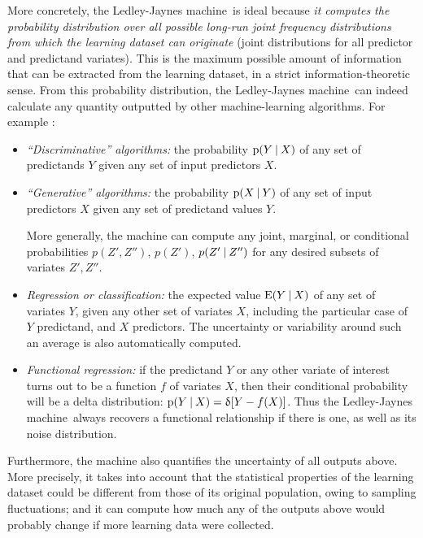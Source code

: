 \documentclass[utf8]{FrontiersinHarvard} %
\newcommand*{\sect}{\S}%
\newcommand*{\eg}{{e.g.}}
\newcommand*{\p}{\mathrm{p}}%
\newcommand*{\E}{\mathrm{E}}
\renewcommand*{\|}[1][]{\nonscript\:#1\vert\nonscript\:\mathopen{}}
\newcommand*{\delt}{\updelta}
\newcommand*{\ljm}{Ledley-Jaynes machine}
\begin{document}
More concretely, the \ljm\ is ideal because \emph{it computes the probability distribution over all possible long-run joint frequency distributions from which the learning dataset can originate} (joint distributions for all predictor and predictand variates). This is the maximum possible amount of information that can be extracted from the learning dataset, in a strict information-theoretic sense. From this probability distribution, the \ljm\ can indeed calculate any quantity outputted by other machine-learning algorithms. For example \citep[for terminology see \eg][\sect~8.6]{murphy2012}:
\begin{itemize}
\item \emph{\enquote{Discriminative} algorithms:} the probability $\p(Y \| X)$ of any set of predictands $Y$ given any set of input predictors $X$.

\item \emph{\enquote{Generative} algorithms:}  the probability $\p(X \| Y)$ of any set of input predictors $X$ given any set of predictand values $Y$.

  More generally, the machine can compute any joint, marginal, or conditional probabilities $p(Z',Z'')$, $p(Z')$, $p(Z'\|Z'')$ for any desired subsets of variates $Z', Z''$.

\item \emph{Regression or classification:} the expected value $\E(Y\|X)$ of any set of variates $Y$, given any other set of variates $X$, including the particular case of $Y$ predictand, and $X$ predictors. The uncertainty or variability around such an average is also automatically computed.
  
\item \emph{Functional regression:} if the predictand $Y$ or any other variate of interest turns out to be a function $f$ of variates $X$, then their conditional probability will be a delta distribution: $\p(Y\|X) = \delt[Y-f(X)]$.
  Thus the \ljm\ always recovers a functional relationship if there is one, as well as its noise distribution.
\end{itemize}
Furthermore, the machine also quantifies the uncertainty of all outputs above. More precisely, it takes into account that the statistical properties of the learning dataset could be different from those of its original population, owing to sampling fluctuations; and it can compute how much any of the outputs above would probably change if more learning data were collected.
\end{document}
